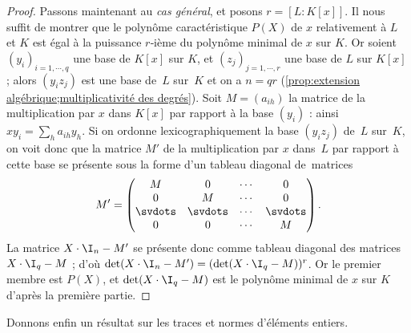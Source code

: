 \documentclass[11pt, useosf,
  title in boldface,
  theorem in new line,
  theorem numbering = section,
  number theorems separately,
]{simplivre}
\begin{document}
\begin{proof}
        Passons maintenant au \emph{cas général}, et posons \( r = [L:K[x]] \). Il nous suffit de montrer que le polynôme caractéristique \( P(X) \) de \( x \) relativement  à \( L \) et \( K \) est égal à la puissance \( r \)‑ième du polynôme minimal de \( x \) sur \( K \). Or soient \( (y_i)_{i = 1, \cdots, q} \) une base de \( K[x] \) sur \( K \), et \( (z_j)_{j = 1, \cdots, r} \) une base de \( L \) sur \( K[x] \) ; alors \( (y_i z_j) \) est une base de~\( L \) sur~\( K \) et on a \( n = qr \) (\cref{prop:extension algébrique;multiplicativité des degrés}). Soit \( M = (a_{ih}) \) la matrice de la multiplication par \( x \) dans \( K[x] \) par rapport à la base \( (y_i) \) : ainsi \( xy_i = \sum_h a_{ih} y_h \). Si on ordonne lexicographiquement la base \( (y_i z_j) \) de~\( L \) sur~\( K \), on voit donc que la matrice \( M' \) de la multiplication par \( x \) dans~\( L \) par rapport à cette base se présente sous la forme d'un tableau diagonal de~matrices
        \[
            M' =
            \begin{pmatrix}
                M & 0 & \cdots & 0\\
                0 & M & \cdots & 0\\
                \svdots & \svdots & \cdots & \svdots\\
                0 & 0 & \cdots & M
            \end{pmatrix}
            .
        \]
        La matrice \( X \cdot \I_n - M' \) se présente donc comme tableau diagonal des matrices \( X \cdot \I_q - M \) ; d'où \( \det(X \cdot \I_n - M') = (\det(X \cdot \I_q - M))^r \). Or le premier membre est \( P(X) \), et \( \det(X \cdot \I_q - M) \) est le polynôme minimal de \( x \) sur \( K \) d'après la première partie.
    \end{proof}

    \medskip
    Donnons enfin un résultat sur les traces et normes d'éléments entiers.
\end{document}
